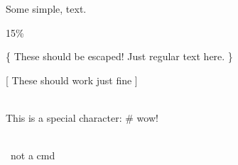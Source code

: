 
Some simple, text.

15\%

\{ These should be escaped! Just regular text here. \}

[ These should work just fine ]

\\

This is a special character: # wow!

\\

\ not a cmd

\cmd
